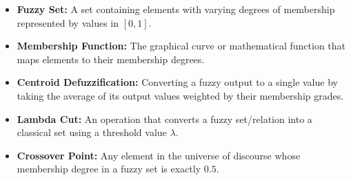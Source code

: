 \documentclass[12pt,a4paper]{article}
\begin{document}
\begin{tcolorbox}[defbox, title={\textbf{One-Line Definitions}}]
\begin{itemize}[leftmargin=*, itemsep=2.5pt, topsep=0pt]
  \item \textbf{Fuzzy Set:} A set containing elements with varying degrees of membership represented by values in $[0, 1]$.
  \item \textbf{Membership Function:} The graphical curve or mathematical function that maps elements to their membership degrees.
  \item \textbf{Centroid Defuzzification:} Converting a fuzzy output to a single value by taking the average of its output values weighted by their membership grades.
  \item \textbf{Lambda Cut:} An operation that converts a fuzzy set/relation into a classical set using a threshold value $\lambda$.
  \item \textbf{Crossover Point:} Any element in the universe of discourse whose membership degree in a fuzzy set is exactly $0.5$.
\end{itemize}
\end{tcolorbox}
\end{document}

